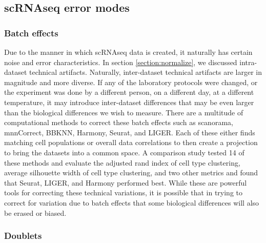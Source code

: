 \subsection{scRNAseq error modes}\label{section:scerrors}

\subsubsection{Batch effects}

\par{
Due to the manner in which scRNAseq data is created, it naturally has certain noise and error characteristics. In section \ref{section:normalize}, we discussed intra-dataset technical artifacts. Naturally, inter-dataset technical artifacts are larger in magnitude and more diverse. If any of the laboratory protocols were changed, or the experiment was done by a different person, on a different day, at a different temperature, it may introduce inter-dataset differences that may be even larger than the biological differences we wish to measure. There are a multitude of computational methods to correct these batch effects such as scanorama\cite{scanorama}, mnnCorrect\cite{batch1}, BBKNN\cite{BBKNN}, Harmony\cite{harmony}, Seurat\cite{seurat3}, and LIGER\cite{LIGER}. Each of these either finds matching cell populations or overall data correlations to then create a projection to bring the datasets into a common space. A comparison study tested 14 of these methods and evaluate the adjusted rand index of cell type clustering, average silhouette width of cell type clustering, and two other metrics and found that Seurat, LIGER, and Harmony performed best. While these are powerful tools for correcting these technical variations, it is possible that in trying to correct for variation due to batch effects that some biological differences will also be erased or biased.
}

\subsubsection{Doublets}

